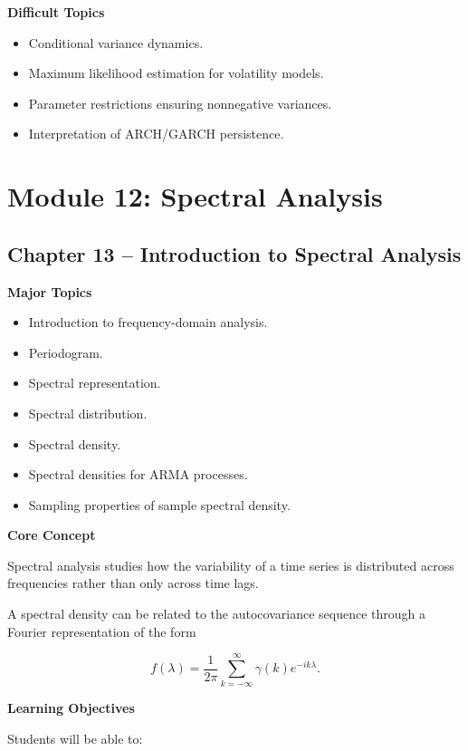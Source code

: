\documentclass[11pt,a4paper]{article}
\begin{document}
\textbf{Difficult Topics}

\begin{itemize}
    \item Conditional variance dynamics.
    \item Maximum likelihood estimation for volatility models.
    \item Parameter restrictions ensuring nonnegative variances.
    \item Interpretation of ARCH/GARCH persistence.
\end{itemize}

\section{Module 12: Spectral Analysis}

\subsection{Chapter 13 -- Introduction to Spectral Analysis}

\textbf{Major Topics}

\begin{itemize}
    \item Introduction to frequency-domain analysis.
    \item Periodogram.
    \item Spectral representation.
    \item Spectral distribution.
    \item Spectral density.
    \item Spectral densities for ARMA processes.
    \item Sampling properties of sample spectral density.
\end{itemize}

\textbf{Core Concept}

Spectral analysis studies how the variability of a time series is distributed
across frequencies rather than only across time lags.

A spectral density can be related to the autocovariance sequence through a
Fourier representation of the form

\[
f(\lambda)
=
\frac{1}{2\pi}
\sum_{k=-\infty}^{\infty}
\gamma(k)e^{-ik\lambda}.
\]

\textbf{Learning Objectives}

Students will be able to:
\end{document}
